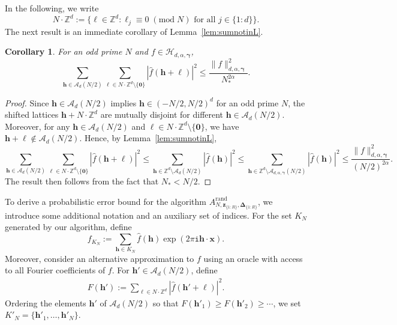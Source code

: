 \documentclass[a4paper,11pt]{article}
\newtheorem{corollary}[theorem]{Corollary}
\newcommand{\rand}{\mathrm{rand}}
\newcommand{\bszero}{\boldsymbol{0}}
\newcommand{\bsh}{\boldsymbol{h}}
\newcommand{\bsl}{\boldsymbol{\ell}}
\newcommand{\bsx}{\boldsymbol{x}}
\newcommand{\bsz}{\boldsymbol{z}}
\newcommand{\bsgamma}{\boldsymbol{\gamma}}
\newcommand{\bsDelta}{\boldsymbol{\Delta}}
\newcommand{\ZZ}{\mathbb{Z}}
\newcommand{\Acal}{\mathcal{A}}
\newcommand{\Hcal}{\mathcal{H}}
\newcommand{\tmod}[1]{{\;(\mathrm{mod}\; #1)}}
\newcommand{\icomp}{\mathtt{i}}
\begin{document}
In the following, we write 
\[
N \cdot \ZZ^d := \{\bsl \in \ZZ^d : \ell_j \equiv 0 \tmod N \text{ for all } j \in \{1{:}d\}\}.
\]
The next result is an immediate corollary of Lemma~\ref{lem:sumnotinL}.
\begin{corollary}\label{cor:sumnotinN}
For an odd prime $N$ and $f \in \Hcal_{d,\alpha,\bsgamma}$,
\[
\sum_{\bsh \in \mathcal{A}_d(N/2)} \sum_{\bsl \in N \cdot \ZZ^d \setminus \{\bszero\}} 
|\widehat{f}(\bsh+\bsl)|^2
\le \frac{\|f\|^2_{d,\alpha,\bsgamma}}{N_*^{2\alpha}}.
\]
\end{corollary}
\begin{proof}
    Since $\bsh \in \mathcal{A}_d(N/2)$ implies $\bsh \in (-N/2,N/2)^d$ for an odd prime $N$, the shifted lattices $\bsh + N \cdot \ZZ^d$ are mutually disjoint for different $\bsh \in \mathcal{A}_d(N/2)$.  Moreover, for any $\bsh \in \mathcal{A}_d(N/2)$ and $\bsl \in N \cdot \ZZ^d \setminus \{\bszero\}$, we have $\bsh + \bsl \notin \mathcal{A}_d(N/2)$.  Hence, by Lemma~\ref{lem:sumnotinL},
    \[
\sum_{\bsh \in \mathcal{A}_d(N/2)} \sum_{\bsl \in N \cdot \ZZ^d \setminus \{\bszero\}} 
|\widehat{f}(\bsh+\bsl)|^2
\le \sum_{\bsh \in \ZZ^d \setminus \Acal_d(N/2)} |\widehat{f}(\bsh)|^2
\le \sum_{\bsh \in \ZZ^d \setminus \Acal_{d,\alpha,\bsgamma}(N/2)} |\widehat{f}(\bsh)|^2
\le \frac{\|f\|^2_{d,\alpha,\bsgamma}}{(N/2)^{2\alpha}}.
\]
The result then follows from the fact that $N_* < N/2$.
\end{proof}

To derive a probabilistic error bound for the algorithm $A^{\rand}_{N,\bsz_{\{1{:}R\}},\bsDelta_{\{1{:}R\}}}$, we introduce some 
additional notation and an auxiliary set of indices. For the set $K_N$ generated by our algorithm, define
\[
f_{K_N} := \sum_{\bsh \in K_N} \widehat{f}(\bsh) \exp(2 \pi \icomp \bsh \cdot \bsx).
\]
Moreover, consider an alternative approximation to $f$ using an oracle with access 
to all Fourier coefficients of $f$. For $\bsh' \in \mathcal{A}_d(N/2)$, define
\begin{align}\label{eq:def_F_bsh'}
F(\bsh') := \sum_{\bsl \in N \cdot \ZZ^d} |\widehat{f}(\bsh' + \bsl)|^2.
\end{align}
Ordering the elements $\bsh'$ of $\mathcal{A}_d(N/2)$ so that 
$F(\bsh'_1) \ge F(\bsh'_2) \ge \cdots$, we set 
$K'_N = \{\bsh'_1, \dots, \bsh'_N\}$.
\end{document}
